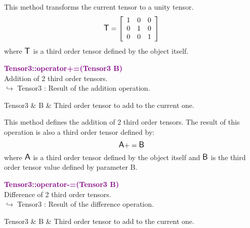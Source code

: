This method transforms the current tensor to a unity tensor.
\begin{equation*}
\mbox{\large\ensuremath{\mathsf{T}}}=\left[\begin{array}{ccc}
1&0&0\\
0&1&0\\
0&0&1
\end{array}\right]
\end{equation*}
where $\mbox{\large\ensuremath{\mathsf{T}}}$ is a third order tensor defined by the object itself.

\textcolor{purple}{\textbf{Tensor3::operator+=(Tensor3 B)}}\label{Tensor3::operator+=(Tensor3 B)}\\
Addition of 2 third order tensors.\\ \hspace*{10mm}$\hookrightarrow$ Tensor3 : Result of the addition operation.

\begin{tcolorbox}[width=\textwidth,myArgs,tabularx={ll|R}]
Tensor3 & B & Third order tensor to add to the current one.
\end{tcolorbox}

This method defines the addition of 2 third order tensors.
The result of this operation is also a third order tensor defined by:
\begin{equation*}
\mbox{\large\ensuremath{\mathsf{A}}} += \mbox{\large\ensuremath{\mathsf{B}}}
\end{equation*}
where $\mbox{\large\ensuremath{\mathsf{A}}}$ is a third order tensor defined by the object itself and $\mbox{\large\ensuremath{\mathsf{B}}}$ is the third order tensor value defined by parameter B.

\textcolor{purple}{\textbf{Tensor3::operator-=(Tensor3 B)}}\label{Tensor3::operator-=(Tensor3 B)}\\
Difference of 2 third order tensors.\\ \hspace*{10mm}$\hookrightarrow$ Tensor3 : Result of the difference operation.

\begin{tcolorbox}[width=\textwidth,myArgs,tabularx={ll|R}]
Tensor3 & B & Third order tensor to add to the current one.
\end{tcolorbox}


